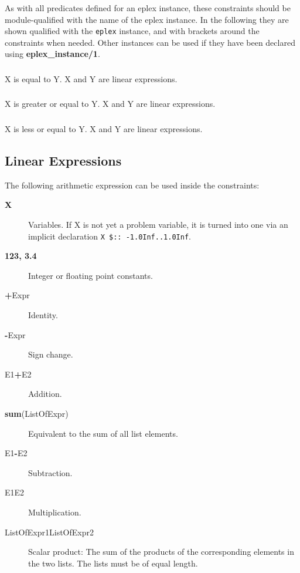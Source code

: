 As with all predicates defined for an eplex instance, these constraints
should be module-qualified with the name of the eplex instance. In the 
following they are shown qualified with the {\tt eplex} instance, and with 
brackets around the constraints when needed. Other instances can
be used if they have been declared using {\bf eplex_instance/1}. 
 
\subsubsection{}
X is equal to Y. X and Y are linear expressions.

\subsubsection{}
X is greater or equal to Y. X and Y are linear expressions.

\subsubsection{}
X is less or equal to Y. X and Y are linear expressions.


\subsection{Linear Expressions}

The following arithmetic expression can be used inside the constraints:
\begin{description}
\item[{\bf X}]
Variables. If X is not yet a problem variable, it is turned into one
	via an implicit declaration {\tt X\ \$::\ -1.0Inf..1.0Inf}.

\item[{\bf 123, 3.4}]
Integer or floating point constants.

\item[{\bf +}Expr]
Identity.

\item[{\bf -}Expr]
Sign change.

\item[E1{\bf +}E2]
Addition.

\item[{\bf sum}(ListOfExpr)]
Equivalent to the sum of all list elements.

\item[E1{\bf -}E2]
Subtraction.

\item[E1{\bf *}E2]
Multiplication.

\item[ListOfExpr1{\bf *}ListOfExpr2]
Scalar product: The sum of the products of the corresponding
elements in the two lists.  The lists must be of equal length.
\end{description}

